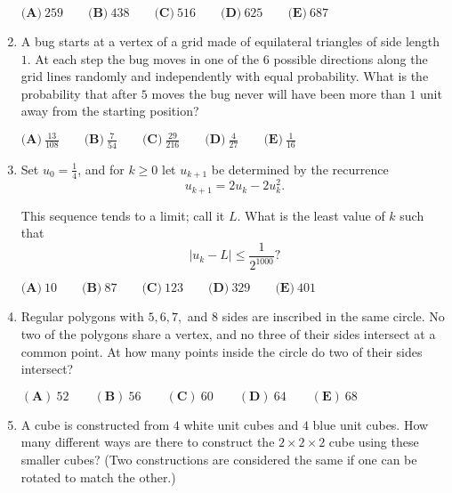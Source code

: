 \documentclass{article}
\begin{document}
\begin{enumerate}[label=\arabic*., itemsep=0.5em]
\(\textbf{(A)}\: 259\qquad\textbf{(B)} \: 438\qquad\textbf{(C)} \: 516\qquad\textbf{(D)} \: 625\qquad\textbf{(E)} \: 687\)\par \vspace{0.5em}\item A bug starts at a vertex of a grid made of equilateral triangles of side length \(1\). At each step the bug moves in one of the \(6\) possible directions along the grid lines randomly and independently with equal probability. What is the probability that after \(5\) moves the bug never will have been more than \(1\) unit away from the starting position?

\(\textbf{(A)}\ \frac{13}{108} \qquad\textbf{(B)}\  \frac{7}{54} \qquad\textbf{(C)}\  \frac{29}{216} \qquad\textbf{(D)}\
\frac{4}{27} \qquad\textbf{(E)}\ \frac{1}{16}\)\par \vspace{0.5em}\item Set \(u_0 = \frac{1}{4}\), and for \(k \ge 0\) let \(u_{k+1}\) be determined by the recurrence 
\begin{equation*}
u_{k+1} = 2u_k - 2u_k^2.
\end{equation*}


This sequence tends to a limit; call it \(L\). What is the least value of \(k\) such that 
\begin{equation*}
|u_k-L| \le \frac{1}{2^{1000}}?
\end{equation*}


\(\textbf{(A)}\: 10\qquad\textbf{(B)}\: 87\qquad\textbf{(C)}\: 123\qquad\textbf{(D)}\: 329\qquad\textbf{(E)}\: 401\)\par \vspace{0.5em}\item Regular polygons with \(5,6,7,\) and \(8\) sides are inscribed in the same circle. No two of the polygons share a vertex, and no three of their sides intersect at a common point. At how many points inside the circle do two of their sides intersect?

\((\textbf{A})\: 52\qquad(\textbf{B}) \: 56\qquad(\textbf{C}) \: 60\qquad(\textbf{D}) \: 64\qquad(\textbf{E}) \: 68\)\par \vspace{0.5em}\item A cube is constructed from \(4\) white unit cubes and \(4\) blue unit cubes. How many different ways are there to construct the \(2 \times 2 \times 2\) cube using these smaller cubes? (Two constructions are considered the same if one can be rotated to match the other.)


\end{enumerate}
\end{document}
